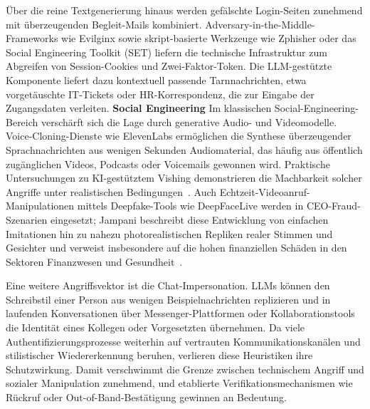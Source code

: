 \documentclass[conference]{IEEEtran}
\begin{document}
Über die reine Textgenerierung hinaus werden gefälschte Login-Seiten zunehmend mit überzeugenden Begleit-Mails kombiniert. Adversary-in-the-Middle-Frameworks wie Evilginx sowie skript-basierte Werkzeuge wie Zphisher oder das Social Engineering Toolkit (SET) liefern die technische Infrastruktur zum Abgreifen von Session-Cookies und Zwei-Faktor-Token. Die LLM-gestützte Komponente liefert dazu kontextuell passende Tarnnachrichten, etwa vorgetäuschte IT-Tickets oder HR-Korrespondenz, die zur Eingabe der Zugangsdaten verleiten.
\newline
\newline
\textbf{Social Engineering}
\newline
Im klassischen Social-Engineering-Bereich verschärft sich die Lage durch generative Audio- und Videomodelle. Voice-Cloning-Dienste wie ElevenLabs ermöglichen die Synthese überzeugender Sprachnachrichten aus wenigen Sekunden Audiomaterial, das häufig aus öffentlich zugänglichen Videos, Podcasts oder Voicemails gewonnen wird. Praktische Untersuchungen zu KI-gestütztem Vishing demonstrieren die Machbarkeit solcher Angriffe unter realistischen Bedingungen~\cite{toapanta_aidriven_2024}. Auch Echtzeit-Videoanruf-Manipulationen mittels Deepfake-Tools wie DeepFaceLive werden in CEO-Fraud-Szenarien eingesetzt; Jampani beschreibt diese Entwicklung von einfachen Imitationen hin zu nahezu photorealistischen Repliken realer Stimmen und Gesichter und verweist insbesondere auf die hohen finanziellen Schäden in den Sektoren Finanzwesen und Gesundheit~\cite{_social_2025}. %

Eine weitere Angriffsvektor ist die Chat-Impersonation. LLMs können den Schreibstil einer Person aus wenigen Beispielnachrichten replizieren und in laufenden Konversationen über Messenger-Plattformen oder Kollaborationstools die Identität eines Kollegen oder Vorgesetzten übernehmen. %
Da viele Authentifizierungsprozesse weiterhin auf vertrauten Kommunikationskanälen und stilistischer Wiedererkennung beruhen, verlieren diese Heuristiken ihre Schutzwirkung. Damit verschwimmt die Grenze zwischen technischem Angriff und sozialer Manipulation zunehmend, und etablierte Verifikationsmechanismen wie Rückruf oder Out-of-Band-Bestätigung gewinnen an Bedeutung.
\end{document}

